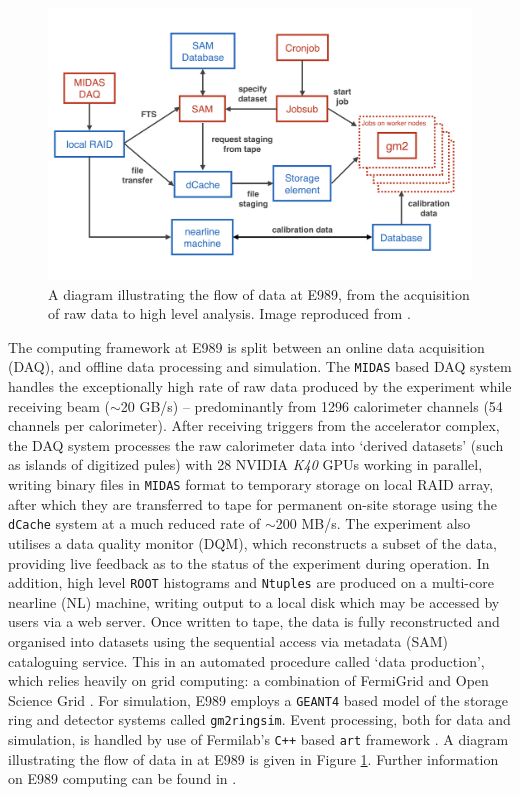 \begin{figure}[t!]
\centering{}
\includegraphics[trim={0 0 0 0},clip,width=.85\textwidth]{Images/Chapter3/DataRecoFlowDiagram.png}
\caption{A diagram illustrating the flow of data at E989, from the acquisition of raw data to high level analysis. Image reproduced from \cite{DataReco}.}
\label{fig:DataRecoFlow}
\end{figure}

The computing framework at E989 is split between an online data acquisition (DAQ), and offline data processing and simulation. The \texttt{MIDAS} \cite{MIDAS} based DAQ system handles the exceptionally high rate of raw data produced by the experiment while receiving beam ($\sim$20 GB/s) -- predominantly from 1296 calorimeter channels (54 channels per calorimeter). After receiving triggers from the accelerator complex, the DAQ system processes the raw calorimeter data into `derived datasets' (such as islands of digitized pules) with 28 NVIDIA \textit{K40} GPUs working in parallel, writing binary files in \texttt{MIDAS} format to temporary storage on local RAID array, after which they are transferred to tape for permanent on-site storage using the \texttt{dCache} system at a much reduced rate of $\sim$200 MB/s. The experiment also utilises a data quality monitor (DQM), which reconstructs a subset of the data, providing live feedback as to the status of the experiment during operation. In addition, high level \texttt{ROOT} \cite{ROOT} histograms and \texttt{Ntuples} are produced on a multi-core nearline (NL) machine, writing output to a local disk which may be accessed by users via a web server. Once written to tape, the data is fully reconstructed and organised into datasets using the sequential access via metadata (SAM) \cite{SAM} cataloguing service. This in an automated procedure called `data production', which relies heavily on grid computing: a combination of FermiGrid \cite{FermiGrid} and Open Science Grid \cite{OSG}. For simulation, E989 employs a \texttt{GEANT4} \cite{GEANT4} based model of the storage ring and detector systems called \texttt{gm2ringsim}. Event processing, both for data and simulation, is handled by use of Fermilab's \texttt{C++} based \texttt{art} framework \cite{art}. A diagram illustrating the flow of data in at E989 is given in Figure \ref{fig:DataRecoFlow}. Further information on E989 computing can be found in \cite{KimSiangComputing}.



